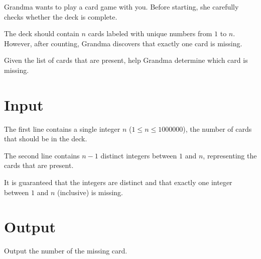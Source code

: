 
Grandma wants to play a card game with you.
Before starting, she carefully checks whether the deck is complete.

The deck should contain $n$ cards labeled with unique numbers from $1$ to $n$.
However, after counting, Grandma discovers that exactly one card is missing.

Given the list of cards that are present, help Grandma determine which card is missing.


\section*{Input}
The first line contains a single integer $n$ ($1 \le n \le 1000000$), the number of cards that should be in the deck.

The second line contains $n-1$ distinct integers between $1$ and $n$, representing the cards that are present.

It is guaranteed that the integers are distinct and that exactly one integer between $1$ and $n$ (inclusive) is missing.

\section*{Output}
Output the number of the missing card.
